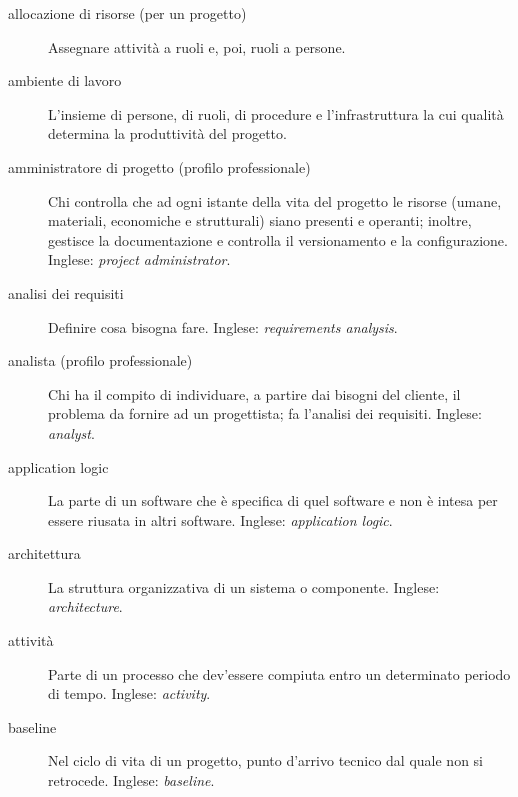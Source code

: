 \documentclass[a4paper]{article}
\begin{document}
		
	\begin{description}
		
			
	\item[allocazione di risorse (per un progetto)] 

			Assegnare attività a ruoli e, poi, ruoli a persone.
			
	\item[ambiente di lavoro] 

			L'insieme di persone, di ruoli, di procedure e l'infrastruttura la cui qualità determina la produttività del progetto.
			
	\item[amministratore di progetto (profilo professionale)] 

			Chi controlla che ad ogni istante della vita del progetto le risorse (umane, materiali, economiche e strutturali) siano presenti e operanti; inoltre, gestisce la documentazione e controlla il versionamento e la configurazione. Inglese: \emph{project administrator}.
			
	\item[analisi dei requisiti] 

			Definire cosa bisogna fare. Inglese: \emph{requirements analysis}.
			
	\item[analista (profilo professionale)] 

			Chi ha il compito di individuare, a partire dai bisogni del cliente, il problema da fornire ad un progettista; fa l'analisi dei requisiti. Inglese: \emph{analyst}.
			
	\item[application logic] 

			La parte di un software che è specifica di quel software e non è intesa per essere riusata in altri software. Inglese: \emph{application logic}.
			
	\item[architettura] 

			La struttura organizzativa di un sistema o componente. Inglese: \emph{architecture}.
			
	\item[attività] 

			Parte di un processo che dev'essere compiuta entro un determinato periodo di tempo. Inglese: \emph{activity}.
			
	\item[baseline] 

			Nel ciclo di vita di un progetto, punto d'arrivo tecnico dal quale non si retrocede. Inglese: \emph{baseline}.
			

\end{description}
\end{document}
